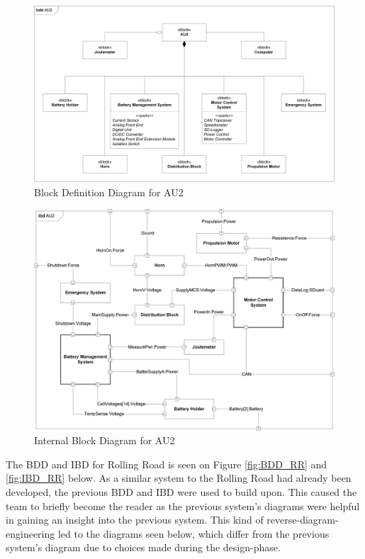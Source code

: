 \newpage
\begin{figure}[H]
	\centering
	\includegraphics[width=1\linewidth]{Architecture/BDD_AU2}
	\caption{Block Definition Diagram for AU2}
	\label{fig:BDD_AU2}
\end{figure}

\begin{figure}[H]
	\centering
	\includegraphics[width=1\linewidth]{Architecture/IBD_AU2}
	\caption{Internal Block Diagram for AU2}
	\label{fig:IBD_AU2}
\end{figure}

The BDD and IBD for Rolling Road is seen on Figure \ref{fig:BDD_RR} and \ref{fig:IBD_RR} below. As a similar system to the Rolling Road had already been developed, the previous BDD and IBD were used to build upon. This caused the team to briefly become the reader as the previous system's diagrams were helpful in gaining an insight into the previous system. This kind of reverse-diagram-engineering led to the diagrams seen below, which differ from the previous system's diagram due to choices made during the design-phase.

